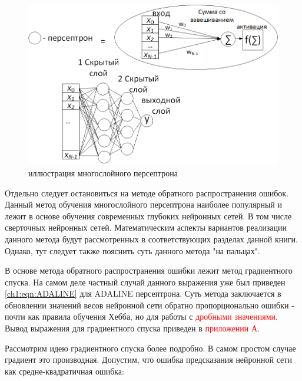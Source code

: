 \documentclass[12pt]{article}
\begin{document}
\begin{sloppypar}
\begin{figure}
	\begin{center}
		\includegraphics[width=0.8\linewidth]{./figuresch1/MLP_Arch.png}
		\caption{иллюстрация многослойного персептрона}		
		\label{ch1:fig:MLP_Arch}
	\end{center}
\end{figure}

Отдельно следует остановиться на методе обратного распространения ошибок. Данный метод обучения многослойного персептрона наиболее популярный и лежит в основе обучения современных глубоких нейронных сетей. В том числе сверточных нейронных сетей. Математическим аспекты вариантов реализации данного метода будут рассмотренных в соответствующих разделах данной книги. Однако, тут следует также пояснить суть данного метода "на пальцах". 

В основе метода обратного распространения ошибки лежит метод градиентного спуска. На самом деле частный случай данного выражения уже был приведен \ref{ch1:eqn:ADALINE} для ADALINE персептрона. Суть метода заключается в обновлении значений весов нейронной сети обратно пропорционально ошибки - почти как правила обучения Хебба, но для работы с 
\textcolor{red}{дробными значениями}. 
Вывод выражения для градиентного спуска приведен в 
\textcolor{red}{приложении А}.

Рассмотрим идею градиентного спуска более подробно.
В самом простом случае градиент это производная. 
Допустим, что ошибка предсказания нейронной сети как средне-квадратичная ошибка:


\end{sloppypar}
\end{document}
